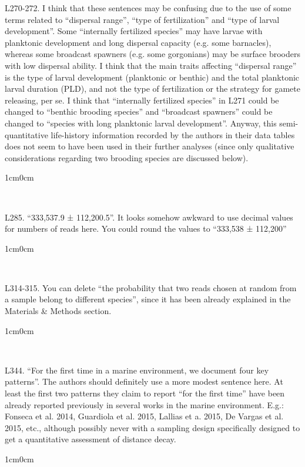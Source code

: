 \documentclass{article}
\newenvironment{response}
	{
	\begin{adjustwidth}{1cm}{0cm}
	\itshape %
	}
	{
	\end{adjustwidth}
	}
\begin{document}
L270-272. I think that these sentences may be confusing due to the use of some terms related to “dispersal range”, “type of fertilization” and “type of larval development”. Some “internally fertilized species” may have larvae with planktonic development and long dispersal capacity (e.g. some barnacles), whereas some broadcast spawners (e.g. some gorgonians) may be surface brooders with low dispersal ability. I think that the main traits affecting “dispersal range” is the type of larval development (planktonic or benthic) and the total planktonic larval duration (PLD), and not the type of fertilization or the strategy for gamete releasing, per se. I think that “internally fertilized species” in L271 could be changed to “benthic brooding species” and “broadcast spawners” could be changed to “species with long planktonic larval development”. Anyway, this semi-quantitative life-history information recorded by the authors in their data tables does not seem to have been used in their further analyses (since only qualitative considerations regarding two brooding species are discussed below).
\begin{response}
  \\
\end{response}

L285. “333,537.9 ± 112,200.5”. It looks somehow awkward to use decimal values for numbers of reads here. You could round the values to “333,538 ± 112,200”
\begin{response}
  \\
\end{response}

L314-315. You can delete “the probability that two reads chosen at random from a sample belong to different species”, since it has been already explained in the Materials & Methods section.
\begin{response}
  \\
\end{response}

L344. “For the first time in a marine environment, we document four key patterns”. The authors should definitely use a more modest sentence here. At least the first two patterns they claim to report “for the first time” have been already reported previously in several works in the marine environment. E.g.: Fonseca et al. 2014, Guardiola et al. 2015, Lallias et a. 2015, De Vargas et al. 2015, etc., although possibly never with a sampling design specifically designed to get a quantitative assessment of distance decay.
\begin{response}
  \\
\end{response}
\end{document}
